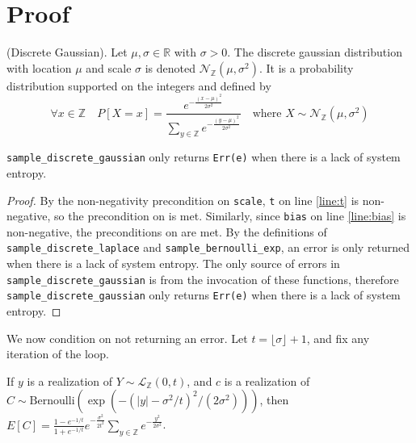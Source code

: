 \documentclass{article}
\begin{document}
\section{Proof} 
 
\begin{definition} 
    (Discrete Gaussian). \cite{CKS20} Let $\mu, \sigma \in \mathbb{R}$ with $\sigma > 0$.  
    The discrete gaussian distribution with location $\mu$ and scale $\sigma$ is denoted $\mathcal{N}_\mathbb{Z}(\mu, \sigma^2)$.  
    It is a probability distribution supported on the integers and defined by 
    \begin{equation*} 
        \forall x \in \mathbb{Z} \quad  P[X = x] = \frac{e^{-\frac{(x - \mu)^2}{2\sigma^2}}}{\sum_{y\in\mathbb{Z}}e^{-\frac{(y - \mu)^2}{2\sigma^2}}} \quad \text{where } X \sim \mathcal{N}_\mathbb{Z}(\mu, \sigma^2) 
    \end{equation*} 
\end{definition} 
 
 
\begin{lemma} 
    \label{err-e} 
    \texttt{sample\_discrete\_gaussian} only returns \texttt{Err(e)} when there is a lack of system entropy. 
\end{lemma} 
 
\begin{proof} 
    By the non-negativity precondition on \texttt{scale}, \texttt{t} on line \ref{line:t} is non-negative,  
    so the precondition on  is met. 
    Similarly, since \texttt{bias} on line \ref{line:bias} is non-negative, the preconditions on  are met. 
    By the definitions of \texttt{sample\_discrete\_laplace} and \texttt{sample\_bernoulli\_exp}, an error is only returned when there is a lack of system entropy. 
    The only source of errors in \texttt{sample\_discrete\_gaussian} is from the invocation of these functions, 
    therefore \texttt{sample\_discrete\_gaussian} only returns \texttt{Err(e)} when there is a lack of system entropy. 
\end{proof} 
 
We now condition on not returning an error. 
Let $t = \lfloor \sigma \rfloor + 1$, and fix any iteration of the loop.  
 
\begin{lemma}\cite{CKS20} 
    \label{E_C} 
    If $y$ is a realization of $Y \sim \mathcal{L}_\mathbb{Z}(0, t)$, and $c$ is a realization of $C \sim \mathrm{Bernoulli}(\exp(-(|y| - \sigma^2 / t)^2 / (2 \sigma^2)))$, then 
    $E[C] = \frac{1 - e^{-1/t}}{1 + e^{-1/t}}e^{-\frac{\sigma^2}{2t^2}} \sum_{y\in \mathbb{Z}} e^{-\frac{y^2}{2\sigma^2}}$. 
\end{lemma} 
 
\end{document}
